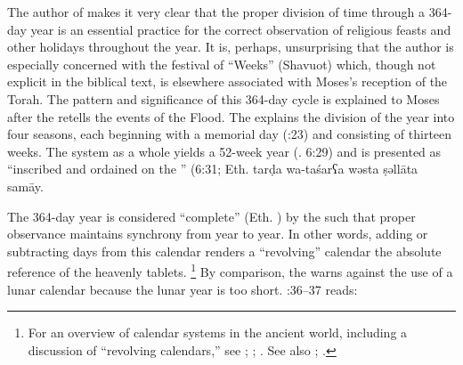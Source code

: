 The author of \jub makes it very clear that the proper division of time through a 364-day year is an essential practice for the correct observation of religious feasts and other holidays throughout the year. It is, perhaps, unsurprising that the author is especially concerned with the festival of ``Weeks'' (Shavuot) which, though not explicit in the biblical text, is elsewhere associated with Moses's reception of the Torah. The pattern and significance of this 364-day cycle is explained to Moses after the \ap retells the events of the Flood. The \ap explains the division of the year into four seasons, each beginning with a memorial day (:23) and consisting of thirteen weeks. The system as a whole yields a 52-week year (\jub. 6:29) and is presented as ``inscribed and ordained on the \HT'' (6:31; Eth.
        {tarḍa wa-taśarʕa wəsta ṣəllāta samāy}.

The 364-day year is considered ``complete'' (Eth. ) by the \ap such that proper observance maintains synchrony from year to year. In other words, adding or subtracting days from this calendar renders a ``revolving'' calendar \visavis the absolute reference of the heavenly tablets.%
    \footnote{%
        For an overview of calendar systems in the ancient world, including a discussion of ``revolving calendars,'' see 
        \cite{bendov2008};
        \cite[214]{glessmer_flint-vanderkam1999};
        \cite{vanderkam1998}. See also
        \cite{baumgarten_baumgarten1977};
        \cite{baumgarten_vt1987a}.}
By comparison, the \ap warns against the use of a lunar calendar because the lunar year is too short. :36--37 reads:

